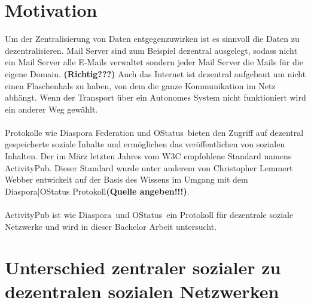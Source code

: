 \section{Motivation}
	Um der Zentralisierung von Daten entgegenzuwirken ist es sinnvoll die Daten zu dezentralisieren. Mail Server sind zum Beispiel dezentral ausgelegt, sodass nicht ein Mail Server alle E-Mails verwaltet sondern jeder Mail Server die Mails für die eigene Domain. \textbf{(Richtig???)} Auch das Internet ist dezentral aufgebaut um nicht einen Flaschenhals zu haben, von dem die ganze Kommunikation im Netz abhängt. Wenn der Transport über ein Autonomes System nicht funktioniert wird ein anderer Weg gewählt. 
	\\\\Protokolle wie \glqq Diaspora Federation und OStatus\grqq~bieten den Zugriff auf dezentral gespeicherte soziale Inhalte und ermöglichen das veröffentlichen von sozialen Inhalten. Der im März letzten Jahres vom W3C empfohlene Standard namens \glqq ActivityPub\grqq. Dieser Standard wurde unter anderem von Christopher Lemmert Webber entwickelt auf der Basis des Wissens im Umgang mit dem Diaspora|OStatus Protokoll\textbf{(Quelle angeben!!!)}. 
	\\\\ActivityPub ist wie \glqq Diaspora\grqq~und \glqq OStatus\grqq~ein Protokoll für dezentrale soziale Netzwerke und wird in dieser Bachelor Arbeit untersucht.
\section{Unterschied zentraler sozialer zu dezentralen sozialen Netzwerken}
\label{sec:Introduction:Motivation}